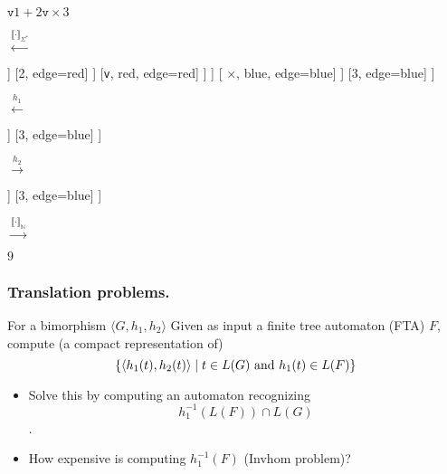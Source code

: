 \documentclass{beamer}
\begin{document}
\begin{frame}
\begin{center}
      \fontsize{6}{7}      
      \begin{minipage}{0.1\linewidth}
        $\texttt{v} 1 + 2\texttt{v} \times 3$
      \end{minipage}
    $\xleftarrow{\llbracket \cdot \rrbracket_{\Sigma^{\ast}}}$
    \begin{minipage}{0.18\linewidth}
	      \centering
	      \begin{forest}
      	      [$\cdot$, blue [$\cdot$, blue, edge=blue [ $\cdot$, red, edge=blue [ \texttt{v}, red, edge=red ] [$\cdot$, red, edge=red [$\cdot$, red, edge=red [$\cdot$, red, edge=red [1, edge=red] [+, red, edge=red]] [2, edge=red] ] [\texttt{v}, red, edge=red] ]  ] [ $\times$, blue, edge=blue] ] [3, edge=blue] ]
           \end{forest}
      \end{minipage}
      $\xleftarrow{h_1}$      
	  \begin{minipage}{0.1\linewidth}
		  \centering
		  \begin{forest}
		    [$r_{m}$, blue [ $r_{a}$, red, edge=blue [$1$, edge=red] [$2$, edge=red] ] [$3$, edge=blue] ] 
		  \end{forest}
	  \end{minipage}
      $\xrightarrow{h_2}$
      \begin{minipage}{0.18\linewidth}
      	\centering
      	\begin{forest}
      		[\texttt{mul}, blue [ \texttt{add},red, edge=blue [$1$, edge=red] [$2$, edge=red] ]  [$3$, edge=blue] ]
      	\end{forest}
      \end{minipage}
      $\xrightarrow{\llbracket \cdot \rrbracket_{\mathbb{N}}}$
      \begin{minipage}{0.05\linewidth}
      	\centering
      	$9$
      \end{minipage}
    \end{center}
\end{frame}

\begin{frame}
  \frametitle{Translation problems.}

  \begin{block}{For a bimorphism $\langle G, h_1, h_2 \rangle$}
    Given as input a finite tree automaton (FTA) $F$, compute (a compact representation of)
    \[ \{ \langle h_1(t), h_2(t) \rangle \mid t \in L(G) \textnormal{ and } h_1(t) \in L(F) \} \]
  \end{block}
  \begin{itemize}
  \item Solve this by computing an automaton recognizing \[h_1^{-1}(L(F)) \cap L(G)\].
  \item \alert{How expensive is computing $h_1^{-1}(F)$ (Invhom problem)?}
  \end{itemize}
\end{frame}
\end{document}
